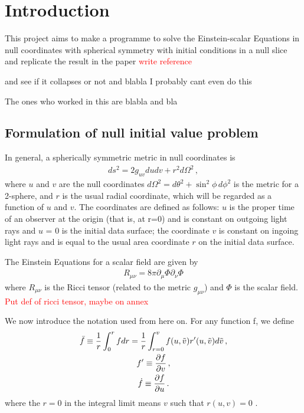 \documentclass[11pt]{article}
\begin{document}
\section{Introduction}

This project aims to make a programme to solve the Einstein-scalar Equations in null coordinates with spherical symmetry with initial conditions in a null slice and replicate the result in the paper \textcolor{red}{write reference}

and see if it collapses or not and blabla I probably cant even do this

The ones who worked in this are blabla and bla


\subsection{Formulation of null initial value problem}

In general, a spherically symmetric metric in null coordinates is
\begin{align}
    ds^2 = 2g_{uv}dudv + r^2d\Omega^2\, ,
\end{align}
where $u$ and $v$ are the null coordinates $d\Omega^2 = d\theta^2+\sin^2\phi\,d\phi^2$ is the metric for a 2-sphere, and $r$ is the usual radial coordinate, which will be regarded as a function of $u$ and $v$. The coordinates are defined as follows: $u$ is the proper time of an observer at the origin (that is, at r=0) and is constant on outgoing light rays and $u$ = 0 is the initial data surface; the coordinate $v$ is constant on ingoing light rays and is equal to the usual area coordinate $r$ on the initial data surface.

The Einstein Equations for a scalar field are given by
\begin{align}
    R_{\mu\nu}=8\pi\partial_\mu\Phi\partial_\nu\Phi 
    \label{eq: Einstein eqs}
\end{align}
where $R_{\mu\nu}$ is the Ricci tensor (related to the metric $g_{\mu\nu}$) and $\Phi$ is the scalar field. \textcolor{red}{Put def of ricci tensor, maybe on annex}

We now introduce the notation used from here on. For any function f, we define
\begin{gather}
    \Bar{f} \equiv \frac{1}{r}\int_0^r f dr = \frac{1}{r}\int_{r=0}^v f(u,\tilde{v}) r'(u,\tilde{v}) d\tilde{v}\, ,\label{eq: bar definition}\\
    f' \equiv \frac{\partial f}{\partial v} \, ,\\
    \dot f \equiv \frac{\partial f}{\partial u} \, .
\end{gather}
where the $r=0$ in the integral limit means $v$ such that $r(u,v)=0$ .
\end{document}
